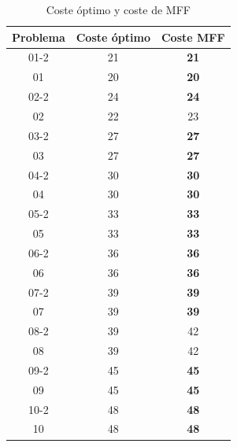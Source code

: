 \documentclass{article}
\begin{document}
    \begin{table}[H]
    \centering
    \caption{Coste óptimo y coste de MFF}
    \label{my-label}
    \begin{tabular}{|c|c|c|}
    \hline
    \textbf{Problema} & \textbf{Coste óptimo} & \textbf{Coste MFF} \\ \hline
    01-2              & 21                    & \textbf{21}        \\ \hline
    01                & 20                    & \textbf{20}        \\ \hline
    02-2              & 24                    & \textbf{24}        \\ \hline
    02                & 22                    & 23                 \\ \hline
    03-2              & 27                    & \textbf{27}        \\ \hline
    03                & 27                    & \textbf{27}        \\ \hline
    04-2              & 30                    & \textbf{30}        \\ \hline
    04                & 30                    & \textbf{30}        \\ \hline
    05-2              & 33                    & \textbf{33}        \\ \hline
    05                & 33                    & \textbf{33}        \\ \hline
    06-2              & 36                    & \textbf{36}        \\ \hline
    06                & 36                    & \textbf{36}        \\ \hline
    07-2              & 39                    & \textbf{39}        \\ \hline
    07                & 39                    & \textbf{39}        \\ \hline
    08-2              & 39                    & 42                 \\ \hline
    08                & 39                    & 42                 \\ \hline
    09-2              & 45                    & \textbf{45}        \\ \hline
    09                & 45                    & \textbf{45}        \\ \hline
    10-2              & 48                    & \textbf{48}        \\ \hline
    10                & 48                    & \textbf{48}        \\ \hline
    \end{tabular}
    \end{table}
    
\end{document}

